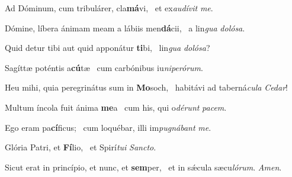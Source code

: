\item Ad Dóminum, cum tribulárer, cla\textbf{má}vi,~\psstar{} et ex\textit{audívit} \textit{me}.

\item Dómine, líbera ánimam meam a lábiis men\textbf{dá}cii,~\psstar{} a lin\textit{gua} \textit{dolósa}.

\item Quid detur tibi aut quid apponátur \textbf{ti}bi,~\psstar{} lin\textit{gua} \textit{dolósa}?

\item Sagíttæ poténtis a\textbf{cú}tæ~\psstar{} cum carbónibus iu\textit{niperórum}.

\item Heu mihi, quia peregrinátus sum in \textbf{Mo}soch,~\psstar{} habitávi ad taberná\textit{cula} \textit{Cedar}!

\item Multum íncola fuit ánima \textbf{me}a~\psstar{} cum his, qui o\textit{dérunt} \textit{pacem}.

\item Ego eram pa\textbf{cí}ficus;~\psstar{} cum loquébar, illi im\textit{pugnábant} \textit{me}.

\item Glória Patri, et \textbf{Fí}lio,~\psstar{} et Spirí\textit{tui} \textit{Sancto}.

\item Sicut erat in princípio, et nunc, et \textbf{sem}per,~\psstar{} et in sǽcula sæcu\textit{lórum}. \textit{Amen}.